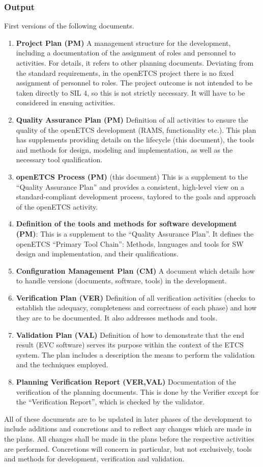 \documentclass{template/openetcs_article}
\begin{document}
\subsubsection{Output}
\label{sec:0-output}
First versions of the following documents.
\begin{enumerate}
\item \textbf{Project Plan (PM)} A management structure for the
  development, including a documentation of the assignment of roles
  and personnel to activities. For details, it refers to other
  planning documents. Deviating from the standard requirements, in the
  openETCS project there is no fixed assignment of personnel to
  roles. The project outcome is not intended to be taken directly to
  SIL 4, so this is not strictly necessary. It will have to be
  considered in ensuing activities.
\item \textbf{Quality Assurance Plan (PM)} Definition of all
  activities to ensure the quality of the openETCS development (RAMS,
  functionality etc.). This plan has supplements providing details on
  the lifecycle (this document), the tools and methods for design, modeling and
  implementation, as well as the necessary tool qualification.
\item \textbf{openETCS Process (PM)} (this document) This is a
  supplement to the ``Quality Assurance Plan'' and provides a consistent,
  high-level view on a standard-compliant development process,
  taylored to the goals and approach of the openETCS activity. 
\item \textbf{Definition of the tools and methods for software
    development (PM)}: This is a supplement to the ``Quality Assurance
  Plan''. It defines the openETCS ``Primary Tool Chain'': Methods,
  languages and tools for SW design and implementation, and their
  qualifications.
\item \textbf{Configuration Management Plan (CM)} A document which
  details how to handle versions (documents, software, tools) in the
  development.
\item \textbf{Verification Plan (VER)} Definition of all verification
  activities (checks to establish the adequacy, completeness and
  correctness of each phase) and how they are to be documented. It
  also addresses methods and tools.
\item \textbf{Validation Plan (VAL)} Definition of how to demonstrate
  that the end result (EVC software) serves its purpose within the
  context of the ETCS system. The plan includes a description the
  means to perform the validation and the techniques employed.
\item \textbf{Planning Verification Report (VER,VAL)}
  Documentation of the verification of the planning documents. This is
  done by the Verifier except for the ``Verification Report'', which is
  checked by the validator.
\end{enumerate}
%
All of these documents are to be updated in later phases of the
development to include additions and concretions and to reflect any
changes which are made in the plans. All changes shall be made in the
plans before the respective activities are performed. Concretions will
concern in particular, but not exclusively, tools and methods for
development, verification and validation.
\end{document}
